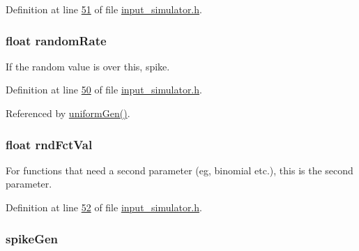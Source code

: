Definition at line \hyperlink{input__simulator_8h_source_l00051}{51} of file \hyperlink{input__simulator_8h_source}{input\+\_\+simulator.\+h}.

\hypertarget{structinput_simulator_state_a1333eb5695ae83d1ffccf24b08bc6288}{}
\subsubsection[{random\+Rate}]{\setlength{\rightskip}{0pt plus 5cm}float random\+Rate}\label{structinput_simulator_state_a1333eb5695ae83d1ffccf24b08bc6288}


If the random value is over this, spike. 



Definition at line \hyperlink{input__simulator_8h_source_l00050}{50} of file \hyperlink{input__simulator_8h_source}{input\+\_\+simulator.\+h}.



Referenced by \hyperlink{input__simulator_8c_source_l00010}{uniform\+Gen()}.

\hypertarget{structinput_simulator_state_a0eb8199754a403ccc8eac256f9193a02}{}
\subsubsection[{rnd\+Fct\+Val}]{\setlength{\rightskip}{0pt plus 5cm}float rnd\+Fct\+Val}\label{structinput_simulator_state_a0eb8199754a403ccc8eac256f9193a02}


For functions that need a second parameter (eg, binomial etc.), this is the second parameter. 



Definition at line \hyperlink{input__simulator_8h_source_l00052}{52} of file \hyperlink{input__simulator_8h_source}{input\+\_\+simulator.\+h}.

\hypertarget{structinput_simulator_state_ae40f21a48f3157bcad074f424046ed2c}{}
\subsubsection[{spike\+Gen}]{ spike\+Gen}\label{structinput_simulator_state_ae40f21a48f3157bcad074f424046ed2c}


